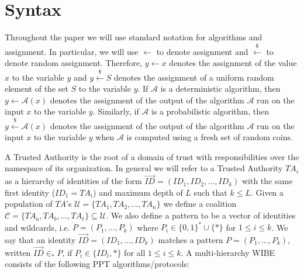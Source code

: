 \documentclass{IEEEtran}
\newcommand{\A}{\mathcal{A}}
\newcommand{\C}{\mathcal{C}}
\newcommand{\U}{\mathcal{U}}
\newcommand{\ID}{\mathit{ID}}
\newcommand{\TA}{\mathit{TA}}
\newcommand{\getsr}{\stackrel{{\scriptscriptstyle\$}}{\gets}}
\begin{document}
\section{Syntax}

Throughout the paper we will use standard notation for algorithms
and assignment. In particular, we will use $\gets$ to denote
assignment and $\getsr$ to denote random assignment. Therefore,
$y\gets x$ denotes the assignment of the value $x$ to the variable
$y$ and $y\getsr S$ denotes the assignment of a uniform random
element of the set $S$ to the variable $y$. If $\A$ is a
deterministic algorithm, then $y\gets \A(x)$ denotes the assignment
of the output of the algorithm $\A$ run on the input $x$ to the
variable $y$. Similarly, if $\A$ is a probabilistic algorithm, then
$y\getsr \A(x)$ denotes the assignment of the output of the
algorithm $\A$ run on the input $x$ to the variable $y$ when $\A$ is
computed using a fresh set of random coins.

A Trusted Authority is the root of a domain of trust with
responsibilities over the namespace of its organization. In general
we will refer to a Trusted Authority $\TA_i$ as a hierarchy of
identities of the form $\vec{\ID} = (\ID_1, \ID_2,
\ldots,\ID_k)$ with the same first identity ($\ID_1 = \TA_i$) and maximum
depth of $L$ such that $k \le L$. Given a population of $\TA$'s $\U
= \{\TA_1, \TA_2, \ldots, \TA_n\}$ we define a coalition $\C =
\{\TA_a, \TA_b, \ldots, \TA_{\ell}\} \subseteq \U$. We also define a pattern to be
a vector of identities and wildcards, i.e. $P=(P_{1},\ldots,P_k)$
where $P_{i} \in \{0,1\}^{*} \cup \{*\}$ for $1\leq i\leq k$. We say
that an identity $\vec{\ID} = (\ID_{1},\ldots,\ID_{k})$ matches a
pattern $P=(P_{1},\ldots,P_{k})$, written $\vec{\ID} \in_{*} P$, if
$P_{i} \in \{ \ID_{i}, *\}$ for all $1\leq i\leq k$. A
multi-hierarchy WIBE consists of the following PPT
algorithms/protocols:
\end{document}
